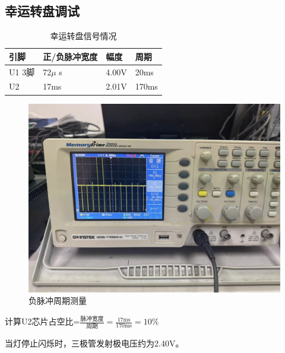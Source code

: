 \documentclass{zjureport}
\begin{document}
\subsection{幸运转盘调试}
\begin{table}[H]
\centering
\caption{幸运转盘信号情况}
\begin{tabular}{C{.15\textwidth}C{.15\textwidth}C{.15\textwidth}C{.2\textwidth}}
  \toprule
引脚    & 正/负脉冲宽度 & 幅度    & 周期    \\
\midrule
U1 3脚 & 72$\mu$ s & 4.00V & 20ms  \\
U2    & 17ms    & 2.01V & 170ms \\
\bottomrule
\end{tabular}
\end{table}
\begin{figure}[H]
  \centering
  \includegraphics[width = .4\textwidth]{./figures/脉冲周期.jpg}
  \caption{负脉冲周期测量}
\end{figure}
计算U2芯片占空比=$\frac{\text{脉冲宽度}}{\text{周期}} = \frac{17\text{ms}}{170\text{ms}} = 10\%$

当灯停止闪烁时，三极管发射极电压约为2.40V。
\end{document}
